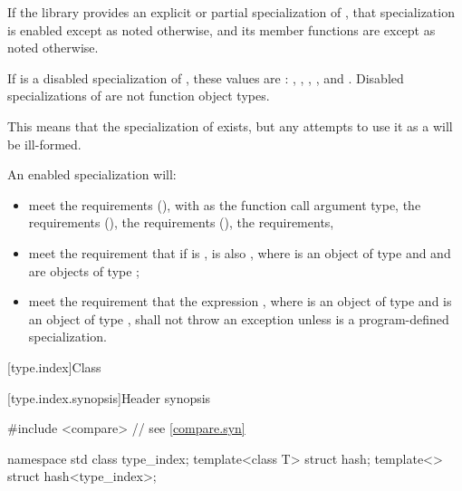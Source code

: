 \pnum
If the library provides an explicit or partial specialization of ,
that specialization is enabled except as noted otherwise,
and its member functions are  except as noted otherwise.

\pnum
If  is a disabled specialization of ,
these values are :
,
,
,
, and
.
Disabled specializations of 
are not function object types.
\begin{note}
This means that the specialization of  exists, but
any attempts to use it as a  will be ill-formed.
\end{note}

\pnum
An enabled specialization  will:
\begin{itemize}
\item meet the  requirements (),
with  as the function
call argument type, the  requirements (),
the  requirements (),
the  requirements,
\item meet the requirement that if  is ,  is
also , where  is an object of type  and  and 
are objects of type ;
\item meet the requirement that the expression , where 
is an object of type  and  is an object of type
, shall not throw an exception unless  is a
program-defined specialization.
\end{itemize}

[type.index]{Class }

[type.index.synopsis]{Header  synopsis}

%
\begin{codeblock}
#include <compare>              // see \ref{compare.syn}

namespace std {
  class type_index;
  template<class T> struct hash;
  template<> struct hash<type_index>;
}
\end{codeblock}


